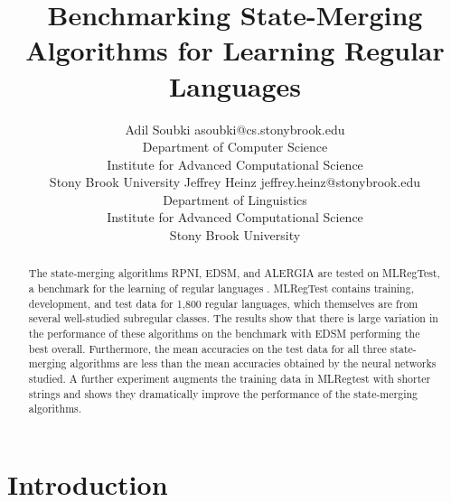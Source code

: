 \documentclass[twoside,11pt]{article}
\newcommand{\papertitle}{Benchmarking State-Merging Algorithms for Learning Regular Languages}
\begin{document}
\title{\papertitle}

\author{
    \name Adil Soubki
    \email asoubki@cs.stonybrook.edu\\
    \addr Department of Computer Science \\
    Institute for Advanced Computational Science \\
    Stony Brook University
    \AND
    \name Jeffrey Heinz
    \email jeffrey.heinz@stonybrook.edu\\
    \addr Department of Linguistics \\
    Institute for Advanced Computational Science \\
    Stony Brook University
}

\editor{}

\maketitle

\begin{abstract}%
  The state-merging algorithms RPNI, EDSM, and ALERGIA are tested on MLRegTest, a benchmark for the learning of regular languages \citep{heinz-etal-2022-mlregtest}. MLRegTest contains training, development, and test data for 1,800 regular languages, which themselves are from several well-studied subregular classes. The results show that there is large variation in the performance of these algorithms on the benchmark with EDSM performing the best overall. Furthermore, the mean accuracies on the test data for all three state-merging algorithms are less than the mean accuracies obtained by the neural networks \citet{heinz-etal-2022-mlregtest} studied. A further experiment augments the training data in MLRegtest with shorter strings and shows they dramatically improve the performance of the state-merging algorithms.
\end{abstract}


\section{Introduction}
\end{document}
